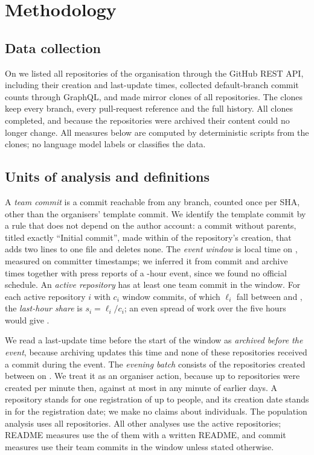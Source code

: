 \documentclass{article}
\begin{document}
\section{Methodology}\label{sec:methods}

\subsection{Data collection}
On \datacollected{} we listed all repositories of the organisation through the GitHub REST API, including their creation and last-update times, collected default-branch commit counts through GraphQL, and made mirror clones of all \NRqOneTotal{} repositories. The clones keep every branch, every pull-request reference and the full history. All clones completed, and because the repositories were archived their content could no longer change. All measures below are computed by deterministic scripts from the clones; no language model labels or classifies the data.

\subsection{Units of analysis and definitions}
A \emph{team commit} is a commit reachable from any branch, counted once per SHA, other than the organisers' template commit. We identify the template commit by a rule that does not depend on the author account: a commit without parents, titled exactly ``Initial commit'', made within \templatesecs{} of the repository's creation, that adds two lines to one file and deletes none. The \emph{event window} is \eventwindow{} local time on \eventdate, measured on committer timestamps; we inferred it from commit and archive times together with press reports of a \eventhours-hour event, since we found no official schedule. An \emph{active repository} has at least one team commit in the window. For each active repository $i$ with $c_i$ window commits, of which $\ell_i$ fall between \lasthourstart{} and \deadline{}, the \emph{last-hour share} is $s_i = \ell_i / c_i$; an even spread of work over the five hours would give \evenshare.

We read a last-update time before the start of the window as \emph{archived before the event}, because archiving updates this time and none of these repositories received a commit during the event. The \emph{evening batch} consists of the repositories created between \batchwindow{} on \batchday{}. We treat it as an organiser action, because up to \NRqOneBatchMaxPerMinute{} repositories were created per minute then, against at most \NRqOneBatchOrganicMaxPerMinute{} in any minute of earlier days. A repository stands for one registration of up to \teamsizemax{} people, and its creation date stands in for the registration date; we make no claims about individuals. The population analysis uses all \NRqOneTotal{} repositories. All other analyses use the \NRqOneActiveN{} active repositories; README measures use the \NRqThreeReadmeWritten{} of them with a written README, and commit measures use their team commits in the window unless stated otherwise.
\end{document}
